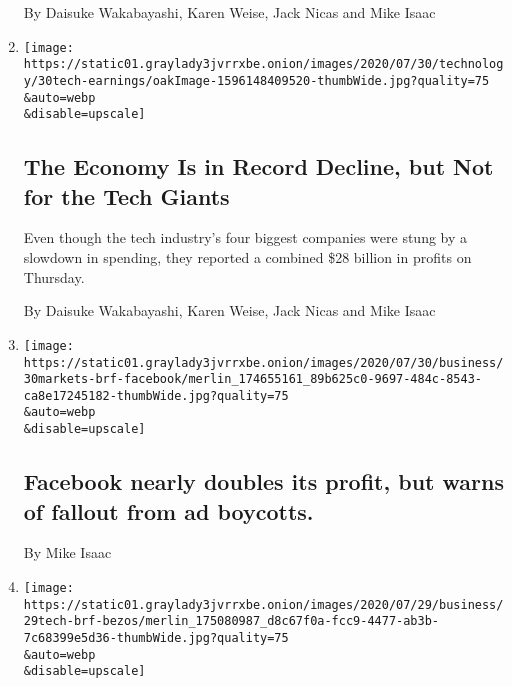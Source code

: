\begin{enumerate}
  By Daisuke Wakabayashi, Karen Weise, Jack Nicas and Mike Isaac
\item
  \href{/2020/07/30/technology/tech-company-earnings-amazon-apple-facebook-google.html}{}

  \texttt{[image: https://static01.graylady3jvrrxbe.onion/images/2020/07/30/technology/30tech-earnings/oakImage-1596148409520-thumbWide.jpg?quality=75\\\&auto=webp\\\&disable=upscale]}

  \hypertarget{the-economy-is-in-record-decline-but-not-for-the-tech-giants-1}{%
  \subsection{The Economy Is in Record Decline, but Not for the Tech
  Giants}\label{the-economy-is-in-record-decline-but-not-for-the-tech-giants-1}}

  Even though the tech industry's four biggest companies were stung by a
  slowdown in spending, they reported a combined \$28 billion in profits
  on Thursday.

  By Daisuke Wakabayashi, Karen Weise, Jack Nicas and Mike Isaac
\item
  \href{/live/2020/07/30/business/stock-market-today-coronavirus/facebook-nearly-doubles-its-profit-but-warns-of-fallout-from-ad-boycotts}{}

  \texttt{[image: https://static01.graylady3jvrrxbe.onion/images/2020/07/30/business/30markets-brf-facebook/merlin\_174655161\_89b625c0-9697-484c-8543-ca8e17245182-thumbWide.jpg?quality=75\\\&auto=webp\\\&disable=upscale]}

  \hypertarget{facebook-nearly-doubles-its-profit-but-warns-of-fallout-from-ad-boycotts}{%
  \subsection{Facebook nearly doubles its profit, but warns of fallout
  from ad
  boycotts.}\label{facebook-nearly-doubles-its-profit-but-warns-of-fallout-from-ad-boycotts}}

  By Mike Isaac
\item
  \href{/live/2020/07/29/technology/tech-ceos-hearing-testimony/tech-executives-looked-like-they-work-in-well-tech-offices}{}

  \texttt{[image: https://static01.graylady3jvrrxbe.onion/images/2020/07/29/business/29tech-brf-bezos/merlin\_175080987\_d8c67f0a-fcc9-4477-ab3b-7c68399e5d36-thumbWide.jpg?quality=75\\\&auto=webp\\\&disable=upscale]}

  \hypertarget{tech-executives-looked-like-they-work-in-well-tech-offices}{%
}
\end{enumerate}
